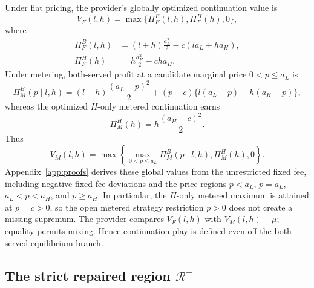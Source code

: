 Under flat pricing, the provider's globally optimized continuation value is
\begin{equation}
 V_F(l,h)=\max\{\Pi_F^B(l,h),\Pi_F^H(h),0\},
 \label{eq:VF-global}
\end{equation}
where
\begin{align}
 \Pi_F^B(l,h)&=(l+h)\frac{a_L^2}{2}-c(la_L+ha_H),
 \label{eq:flat-both-profit}\\
 \Pi_F^H(h)&=h\frac{a_H^2}{2}-cha_H.
 \label{eq:flat-H-profit}
\end{align}
Under metering, both-served profit at a candidate marginal price $0<p\leq a_L$ is
\begin{equation}
 \Pi_M^B(p\mid l,h)
 =(l+h)\frac{(a_L-p)^2}{2}
 +(p-c)\{l(a_L-p)+h(a_H-p)\},
 \label{eq:metered-profit}
\end{equation}
whereas the optimized $H$-only metered continuation earns
\begin{equation}
 \Pi_M^H(h)=h\frac{(a_H-c)^2}{2}.
 \label{eq:metered-H-profit}
\end{equation}
Thus
\begin{equation}
 V_M(l,h)=\max\left\{\max_{0<p\leq a_L}\Pi_M^B(p\mid l,h),\Pi_M^H(h),0\right\}.
 \label{eq:VM-global}
\end{equation}
Appendix~\ref{app:proofs} derives these global values from the unrestricted fixed fee, including negative fixed-fee deviations and the price regions $p<a_L$, $p=a_L$, $a_L<p<a_H$, and $p\geq a_H$. In particular, the $H$-only metered maximum is attained at $p=c>0$, so the open metered strategy restriction $p>0$ does not create a missing supremum. The provider compares $V_F(l,h)$ with $V_M(l,h)-\mu$; equality permits mixing. Hence continuation play is defined even off the both-served equilibrium branch.

\subsection{The strict repaired region $\mathcal R^+$}

